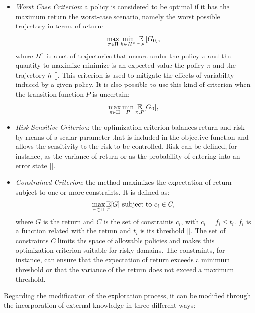 \begin{itemize}
	\item \emph{Worst Case Criterion}: a policy is considered to be optimal if it has the maximum return \wrt the worst-case scenario, namely the worst possible trajectory in terms of return:
	\begin{align}
	\max_{\pi \in \Pi}\min_{h \in H^{\pi}} \operatorname*{\mathbb{E}}_{\pi, w}[G_{0}],
	\end{align}
	where $H^{\pi}$ is a set of trajectories that occurs under the policy $\pi$ and the quantity to maximize-minimize is an expected value \wrt the policy $\pi$ and the trajectory $h$ [\cite{Heger1994ConsiderationOR}]. This criterion is used to mitigate the effects of variability induced by a given policy. It is also possible to use this kind of criterion when the transition function $P$ is uncertain:
	\begin{align}
	\max_{\pi \in \Pi}\min_{P} \operatorname*{\mathbb{E}}_{\pi, P}[G_{0}],
	\end{align}
	\item \emph{Risk-Sensitive Criterion}: the optimization criterion balances return and risk by means of a scalar parameter that is included in the objective function and allows the sensitivity to the risk to be controlled. Risk can be defined, for instance, as the variance of return or as the probability of entering into an error state [\cite{Geibel2005RiskSensitiveRL}].
	\item \emph{Constrained Criterion}: the method maximizes the expectation of return subject to one or more constraints. It is defined as:
	\begin{align}
		\max_{\pi \in \Pi} \operatorname*{\mathbb{E}}_{\pi}[G] \text{ subject to }c_i \in C,
	\end{align}
	where $G$ is the return and $C$ is the set of constraints $c_i$, with $c_i = f_i \leq t_i$. $f_i$ is a function related with the return and $t_i$ is its threshold [\cite{moldovan2012safe}]. The set of constraints $C$ limits the space of allowable policies and makes this optimization criterion suitable for risky domains. The constraints, for instance, can ensure that the expectation of return exceeds a minimum threshold or that the variance of the return does not exceed a maximum threshold.
	
\end{itemize}
Regarding the modification of the exploration process, it can be modified through the incorporation of external knowledge in three different ways:
